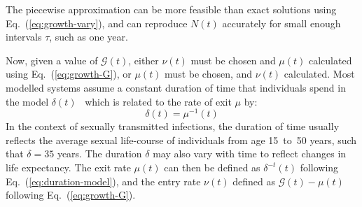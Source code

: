 The piecewise approximation can be more feasible
than exact solutions using Eq.~(\ref{eq:growth-vary}),
and can reproduce $N(t)$ accurately for small enough intervals $\tau$,
such as one year.
\par
Now, given a value of $\mathcal{G}(t)$,
either $\nu(t)$ must be chosen and $\mu(t)$ calculated using Eq.~(\ref{eq:growth-G}),
or $\mu(t)$ must be chosen, and $\nu(t)$ calculated.
Most modelled systems assume
a constant duration of time that individuals spend in the model $\delta(t)$~\citep{Anderson1991}
which is related to the rate of exit $\mu$ by:
\begin{equation}\label{eq:duration-model}
\delta(t) = \mu^{-1}(t)
\end{equation}
In the context of sexually transmitted infections, the duration of time usually reflects
the average sexual life-course of individuals from age 15~to~50 years,
such that $\delta = 35$ years.
The duration $\delta$ may also vary with time to reflect changes in life expectancy.
The exit rate $\mu(t)$ can then be defined as $\delta^{-t}(t)$
following Eq.~(\ref{eq:duration-model}),
and the entry rate $\nu(t)$ defined as $\mathcal{G}(t) - \mu(t)$
following Eq.~(\ref{eq:growth-G}).
